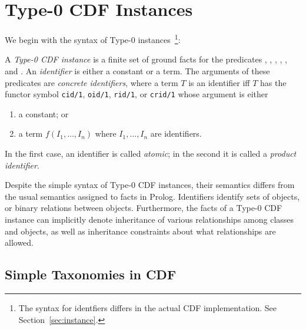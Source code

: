 \section{Type-0 CDF Instances}

We begin with the syntax of Type-0 instances~\footnote{The syntax for
identfiers differs in the actual CDF implementation. See
Section~\ref{sec:instance}.}: 

\begin{definition} \label{def:ids}
A {\em Type-0 CDF instance} is a finite set of ground facts for the
predicates , , ,
, , and .  An {\em
identifier} is either a constant or a term.  The arguments of these
predicates are {\em concrete identifiers}, where a term $T$ is an
identifier iff $T$ has the functor symbol {\tt cid/1}, {\tt oid/1},
{\tt rid/1}, or {\tt crid/1} whose argument is either

\begin{enumerate}
\item a constant; or 
\item a term $f(I_1,\ldots,I_n)$ where $I_1,\ldots,I_n$ are identifiers.
\end{enumerate}
In the first case, an identifier is called {\em atomic}; in the second
it is called a {\em product identifier}.
\end{definition}

Despite the simple syntax of Type-0 CDF instances, their semantics
differs from the usual semantics assigned to facts in Prolog.
Identifiers identify sets of objects, or binary relations between
objects.  Furthermore, the facts of a Type-0 CDF instance can
implicitly denote inheritance of various relationships among classes
and objects, as well as inheritance constraints about what
relationships are allowed.

\subsection{Simple Taxonomies in CDF}

